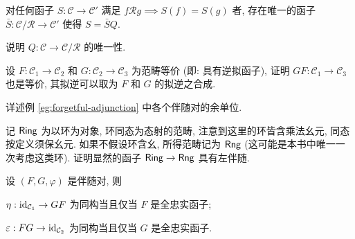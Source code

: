 \begin{Exercises}
\begin{compactitem}
			\item 对任何函子 $S: \mathcal{C} \to \mathcal{C}'$ 满足 $f \mathcal{R} g \implies S(f)=S(g)$ 者, 存在唯一的函子 $\bar{S}: \mathcal{C}/\mathcal{R} \to \mathcal{C}'$ 使得 $S = \bar{S} Q$.
		\end{compactitem}
		说明 $Q: \mathcal{C} \to \mathcal{C}/\mathcal{R}$ 的唯一性.
	\item 设 $F: \mathcal{C}_1 \to \mathcal{C}_2$ 和 $G: \mathcal{C}_2 \to \mathcal{C}_3$ 为范畴等价 (即: 具有逆拟函子), 证明 $GF: \mathcal{C}_1 \to \mathcal{C}_3$ 也是等价, 其拟逆可以取为 $F$ 和 $G$ 的拟逆之合成.
	\item 详述例 \ref{eg:forgetful-adjunction} 中各个伴随对的余单位.
	\item 记 $\mathsf{Ring}$ 为以环为对象, 环同态为态射的范畴, 注意到这里的环皆含乘法幺元, 同态按定义须保幺元. 如果不假设环含幺, 所得范畴记为 $\mathsf{Rng}$ (这可能是本书中唯一一次考虑这类环). 证明显然的函子 $\mathsf{Ring} \to \mathsf{Rng}$ 具有左伴随.
	\item 设 $(F, G, \varphi)$ 是伴随对, 则
		\begin{inparaenum}[(i)]
			\item $\eta: \mathrm{id}_{\mathcal{C}_1} \to GF$ 为同构当且仅当 $F$ 是全忠实函子;
			\item $\varepsilon: FG \to \mathrm{id}_{\mathcal{C}_2}$ 为同构当且仅当 $G$ 是全忠实函子.
		\end{inparaenum}


\end{Exercises}
